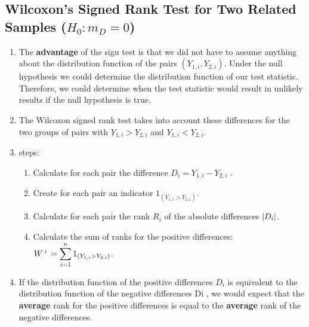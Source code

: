 \subsection{Wilcoxon’s Signed Rank Test for Two Related Samples ($H_0 : m _D = 0$)}

\begin{enumerate}
    \item The \textbf{advantage} of the sign test is that we did not have to assume anything about the distribution function of the pairs $(Y_{1,i} , Y_{2,i} )$. 
    Under the null hypothesis we could determine the distribution function of our test statistic. 
    Therefore, we could determine when the test statistic would result in unlikely results if the null hypothesis is true.
    \hfill \cite{statistics/book/Statistics-for-Data-Scientists/Maurits-Kaptein}

    \item The Wilcoxon signed rank test takes into account these differences for the two groups of pairs with $Y_{1,i} > Y_{2,i}$ and $Y_{1,i} < Y_{2,i} $.
    \hfill \cite{statistics/book/Statistics-for-Data-Scientists/Maurits-Kaptein}
    
    \item steps:
    \begin{enumerate}
        \item Calculate for each pair the difference $D_i = Y_{1,i} - Y_{2,i}$ .
        \hfill \cite{statistics/book/Statistics-for-Data-Scientists/Maurits-Kaptein}

        \item Create for each pair an indicator $1_{(Y_{1,i} >Y_{2,i} )}$.
        \hfill \cite{statistics/book/Statistics-for-Data-Scientists/Maurits-Kaptein}

        \item Calculate for each pair the rank $R_ i$ of the absolute differences $\left| D_i \right|$.
        \hfill \cite{statistics/book/Statistics-for-Data-Scientists/Maurits-Kaptein}
        
        \item Calculate the sum of ranks for the positive differences: $W^+ = \displaystyle\sum^n _{i=1} 1_{(Y_{1,i} >Y_{2,i} )}$.
        \hfill \cite{statistics/book/Statistics-for-Data-Scientists/Maurits-Kaptein}
    \end{enumerate}

    \item If the distribution function of the positive differences $D_i$ is equivalent to the distribution function of the negative differences Di , we would expect that the \textbf{average} rank for the positive differences is equal to the \textbf{average} rank of the negative differences.
    \hfill \cite{statistics/book/Statistics-for-Data-Scientists/Maurits-Kaptein}


\end{enumerate}
